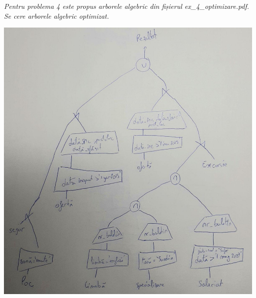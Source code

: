 \documentclass[a4paper,12pt]{article}
\begin{document}
		\newpage
		
	\section{}
		\textit{Pentru problema 4 este propus arborele algebric din fișierul ex\_4\_optimizare.pdf. Se cere arborele algebric optimizat.}\\
		\newline
		
		\includegraphics[scale=0.5]{ex_5_tree.jpg}
	
	
\end{document}
